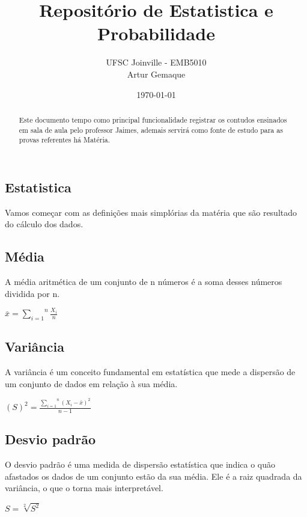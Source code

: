 \documentclass{article}
\title{\textbf{Repositório de Estatistica e Probabilidade}}
\author{UFSC Joinville - EMB5010 \\ Artur Gemaque}
\date{\today}
\begin{document}
\maketitle

\begin{abstract}
Este documento tempo como principal funcionalidade registrar os contudos ensinados 
em sala de aula pelo professor Jaimes, ademais servirá como fonte de estudo para as 
provas referentes há Matéria.
\end{abstract}

\begin{multicols}{2} %
\section{ Estatistica}

      Vamos começar com as definições mais simplórias da matéria que são resultado do cálculo dos dados.

      \subsection{Média}
      A média aritmética de um conjunto de n números é a soma desses números dividida por n.
        \begin{center}
          $ \overset{\_}{x} =  \overset{n}{\underset{i=1}{\sum}} \frac{X_i}{n}  $
        \end{center}

      \subsection{Variância}
      A variância é um conceito fundamental em estatística que mede a dispersão de um conjunto de dados em relação à sua média.
        \begin{center}
          $ (S)^2 =  \frac{\overset{n}{\underset{i=1}{\sum}} (X_i - \overset{\_}{x} )^2 }{n - 1} $
        \end{center}

      \subsection{Desvio padrão}
      O desvio padrão é uma medida de dispersão estatística que indica o quão afastados os 
      dados de um conjunto estão da sua média. Ele é a raiz quadrada da variância, o que o 
      torna mais interpretável.
        \begin{center}
          $ S = \sqrt[2]{S^2}$
        \end{center}


\end{multicols}
\end{document}
